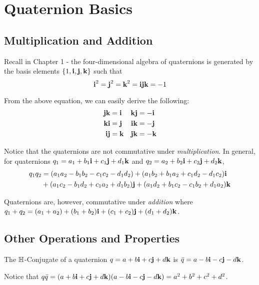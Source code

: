 \section{Quaternion Basics}

\subsection{Multiplication and Addition}

Recall in Chapter 1 - the four-dimensional algebra of quaternions is generated by the basis elements $\{1,\textbf{i},\textbf{j},\textbf{k}\}$ such that 
\begin{equation} \label{quat_eq}
\textbf{i}^2 = \textbf{j}^2 = \textbf{k}^2 = \textbf{i} \textbf{j} \textbf{k} = -1
\end{equation}

From the above equation, we can easily derive the following:
\begin{align*}
	\textbf{j}\textbf{k} &= \textbf{i} & \textbf{k}\textbf{j} &= -\textbf{i} \\
	\textbf{k}\textbf{i} &= \textbf{j} & \textbf{i}\textbf{k} &= -\textbf{j} \\
	\textbf{i}\textbf{j} &= \textbf{k} & \textbf{j}\textbf{k} &= -\textbf{k}
\end{align*}

Notice that the quaternions are not commutative under \emph{multiplication}. In general, for quaternions $q_1 = a_1 + b_1\textbf{i} + c_1\textbf{j} + d_1\textbf{k}$ and $q_2 = a_2 + b_2\textbf{i} + c_2\textbf{j} + d_2\textbf{k}$, 
\begin{align*}
	q_1q_2 &= (a_1a_2 - b_1b_2 - c_1c_2 - d_1d_2) + (a_1b_2 + b_1a_2 + c_1d_2 - d_1c_2)\textbf{i} \\
		   &+ (a_1c_2 - b_1d_2 + c_1a_2 + d_1b_2)\textbf{j} + (a_1d_2 + b_1c_2 - c_1b_2 + d_1a_2)\textbf{k}
\end{align*}


Quaternions are, however, commutative under \emph{addition} where $q_1+q_2 = (a_1+a_2) + (b_1+b_2)\textbf{i} + (c_1+c_2)\textbf{j} + (d_1+d_2)\textbf{k}$.

\subsection{Other Operations and Properties}

\begin{definition}[$\HH$-Conjugate]
	The $\HH$-Conjugate of a quaternion $q = a + b\textbf{i} + c\textbf{j} + d\textbf{k}$ is $\bar{q} = a - b\textbf{i} - c\textbf{j} - d\textbf{k}$.
\end{definition}

\begin{remark}
	Notice that $q\bar{q} = (a + b\textbf{i} + c\textbf{j} + d\textbf{k})(a - b\textbf{i} -c\textbf{j}-d\textbf{k}) = a^2+b^2+c^2+d^2$.
\end{remark}

